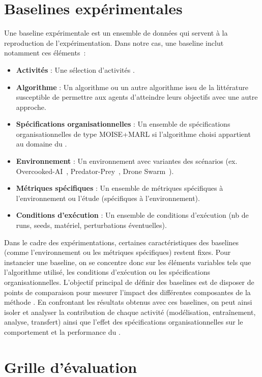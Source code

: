 \section{Baselines expérimentales}

Une baseline expérimentale est un ensemble de données qui servent à la reproduction de l'expérimentation. Dans notre cas, une baseline inclut notamment ces éléments~:
\begin{itemize}
  \item \textbf{Activités} : Une sélection d'activités .
  \item \textbf{Algorithme} : Un algorithme  ou un autre algorithme issu de la littérature susceptible de permettre aux agents d'atteindre leurs objectifs avec une autre approche.
  \item \textbf{Spécifications organisationnelles} : Un ensemble de spécifications organisationnelles de type MOISE+MARL si l'algorithme choisi appartient au domaine du .
  \item \textbf{Environnement} : Un environnement avec variantes des scénarios (ex. Overcooked-AI~\cite{overcookedai}, Predator-Prey~\cite{lowe2017multi}, Drone Swarm~\cite{cage_challenge_3_announcement}).
  \item \textbf{Métriques spécifiques} : Un ensemble de métriques spécifiques à l'environnement ou l'étude (spécifiques à l'environnement).
  \item \textbf{Conditions d'exécution} : Un ensemble de conditions d'exécution (nb de runs, seeds, matériel, perturbations éventuelles).
\end{itemize}

Dans le cadre des expérimentations, certaines caractéristiques des baselines (comme l'environnement ou les métriques spécifiques) restent fixes. Pour instancier une baseline, on se concentre donc sur les éléments variables tels que l'algorithme utilisé, les conditions d'exécution ou les spécifications organisationnelles. L'objectif principal de définir des baselines est de disposer de points de comparaison pour mesurer l'impact des différentes composantes de la méthode . En confrontant les résultats obtenus avec ces baselines, on peut ainsi isoler et analyser la contribution de chaque activité (modélisation, entraînement, analyse, transfert) ainsi que l'effet des spécifications organisationnelles sur le comportement et la performance du .



\section{Grille d'évaluation}\label{sec:evaluation_grid}

